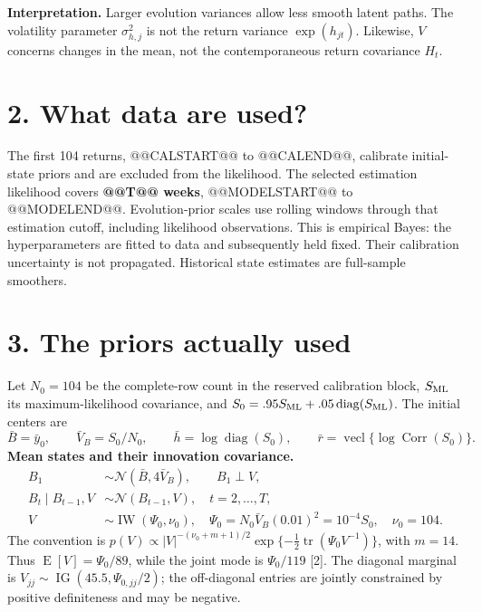 \documentclass[10pt,a4paper]{article}
\newcommand{\Normal}{\mathcal N}
\newcommand{\IG}{\operatorname{IG}}
\newcommand{\IW}{\operatorname{IW}}
\newcommand{\diag}{\operatorname{diag}}
\newcommand{\vecl}{\operatorname{vecl}}
\newcommand{\E}{\operatorname E}
\begin{document}
\textbf{Interpretation.} Larger evolution variances allow less smooth latent paths.
The volatility parameter $\sigma_{h,j}^2$ is not the return variance $\exp(h_{jt})$.
Likewise, $V$ concerns changes in the mean, not the contemporaneous return covariance $H_t$.

\section*{2. What data are used?}
The first 104 returns, @@CALSTART@@ to @@CALEND@@, calibrate initial-state priors and are
excluded from the likelihood. The selected estimation likelihood covers \textbf{@@T@@ weeks},
@@MODELSTART@@ to @@MODELEND@@. Evolution-prior scales use rolling windows through that
estimation cutoff, including likelihood observations. This is empirical Bayes: the
hyperparameters are fitted to data and subsequently held fixed. Their calibration
uncertainty is not propagated. Historical state estimates are full-sample smoothers.

\clearpage
\section*{3. The priors actually used}
Let $N_0=104$ be the complete-row count in the reserved calibration block, $S_{\rm ML}$ its
maximum-likelihood covariance, and $S_0=.95S_{\rm ML}+.05\diag(S_{\rm ML})$.
The initial centers are
\[
\bar B=\bar y_0,\qquad \bar V_B=S_0/N_0,\qquad
\bar h=\log\diag(S_0),\qquad \bar r=\vecl\{\log\operatorname{Corr}(S_0)\}.
\]
\textbf{Mean states and their innovation covariance.}
\begin{align*}
B_1&\sim\Normal(\bar B,4\bar V_B),\qquad B_1\perp V,\\
B_t\mid B_{t-1},V&\sim\Normal(B_{t-1},V),\quad t=2,\ldots,T,\\
V&\sim\IW(\Psi_0,\nu_0),\quad
\Psi_0=N_0\bar V_B(0.01)^2=10^{-4}S_0,\quad\nu_0=104.
\end{align*}
The convention is $p(V)\propto |V|^{-(\nu_0+m+1)/2}
\exp\{-\tfrac12\operatorname{tr}(\Psi_0V^{-1})\}$, with $m=14$.
Thus $\E[V]=\Psi_0/89$, while the joint mode is $\Psi_0/119$ [2].
The diagonal marginal is $V_{jj}\sim\IG(45.5,\Psi_{0,jj}/2)$; the off-diagonal entries
are jointly constrained by positive definiteness and may be negative.
\end{document}
